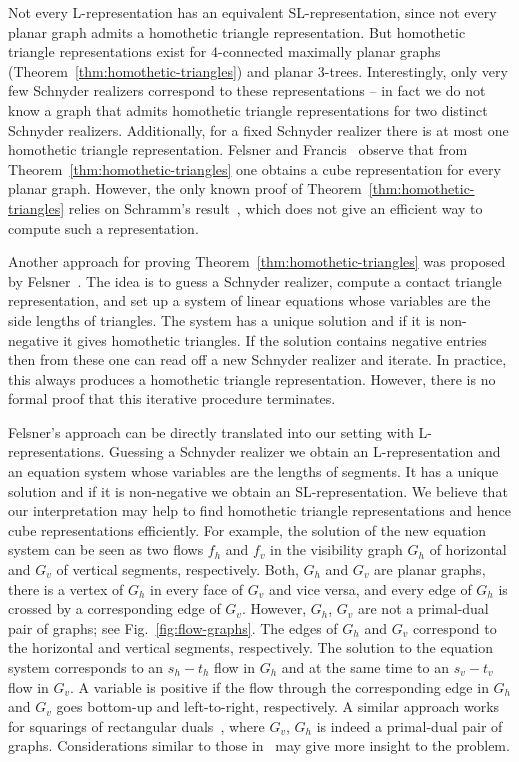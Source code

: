 \documentclass{llncs}
\begin{document}
Not every L-representation has an equivalent SL-representation, since not every planar graph admits a homothetic triangle representation. But homothetic triangle representations exist for $4$-connected maximally planar graphs (Theorem~\ref{thm:homothetic-triangles}) and planar $3$-trees. 
Interestingly, only very few Schnyder realizers correspond to these representations -- in fact we do not know a graph that admits homothetic triangle representations for two distinct Schnyder realizers. Additionally, for a fixed Schnyder realizer there is at most one homothetic triangle representation.
Felsner and Francis~\cite{Felsner11} observe that from Theorem~\ref{thm:homothetic-triangles} one obtains a cube representation for every planar graph. However, the only known proof of Theorem~\ref{thm:homothetic-triangles} relies on Schramm's result~\cite{schramm2007combinatorically}, which does not give an efficient way to compute such a representation. 

Another approach for proving Theorem~\ref{thm:homothetic-triangles} was proposed by Felsner~\cite{Felsner11}. The idea is to guess a Schnyder realizer, compute a contact triangle representation, and set up a system of linear equations whose variables are the side lengths of triangles. The system has a unique solution and if it is non-negative it gives homothetic triangles. If the solution contains negative entries then from these one can read off a new Schnyder realizer and iterate. In practice, this always produces a homothetic triangle representation. However, there is no formal proof that this iterative procedure terminates.

Felsner's approach can be directly translated into our setting with L-representations. Guessing a Schnyder realizer we obtain an L-representation and an equation system whose variables are the lengths of segments. It has a unique solution and if it is non-negative we obtain an SL-representation. We believe that our interpretation may help to find homothetic triangle representations and hence cube representations efficiently. For example, the solution of the new equation system can be seen as two flows $f_h$ and $f_v$ in the visibility graph $G_h$ of horizontal and $G_v$ of vertical segments, respectively. Both, $G_h$ and $G_v$ are planar graphs, there is a vertex of $G_h$ in every face of $G_v$ and vice versa, and every edge of $G_h$ is crossed by a corresponding edge of $G_v$. However, $G_h$, $G_v$ are not a primal-dual pair of graphs; see Fig.~\ref{fig:flow-graphs}. The edges of $G_h$ and $G_v$ correspond to the horizontal and vertical segments, respectively. The solution to the equation system corresponds to an $s_h-t_h$ flow in $G_h$ and at the same time to an $s_v-t_v$ flow in $G_v$. A variable is positive if the flow through the corresponding edge in $G_h$ and $G_v$ goes bottom-up and left-to-right, respectively. A similar approach works for squarings of rectangular duals~\cite{FelsnerSurvey}, where $G_v$, $G_h$ is indeed a primal-dual pair of graphs. Considerations similar to those in~\cite{FelsnerSurvey} may give more insight to the problem.
\end{document}
